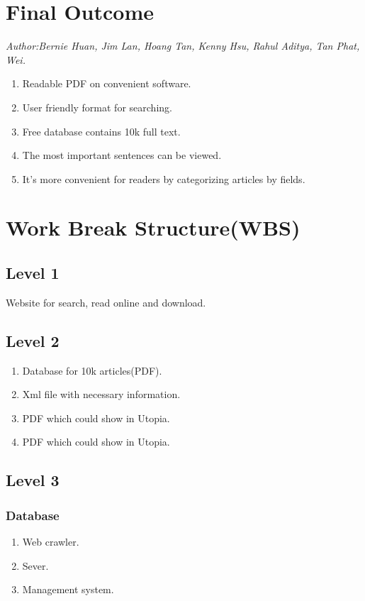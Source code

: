 
\section{Final Outcome}
\textit{\footnotesize Author:Bernie Huan, Jim Lan, Hoang Tan, Kenny Hsu, Rahul Aditya, Tan Phat, Wei.}\\
\begin{enumerate}
	\item Readable PDF on convenient software.
	\item User friendly format for searching.
	\item Free database contains 10k full text.
	\item The most important sentences can be viewed.
	\item It’s more convenient for readers by categorizing articles by fields.
\end{enumerate}
\section{Work Break Structure(WBS)}
\subsection*{Level 1}
Website for search, read online and download.
\subsection*{Level 2}
\begin{enumerate}
	\item Database for 10k articles(PDF).
	\item Xml file with necessary  information.
	\item PDF which could show in Utopia.
	\item PDF which could show in Utopia.
\end{enumerate}	
\subsection*{Level 3}	
\subsubsection*{Database}
\begin{enumerate}
	\item Web crawler.
	\item Sever.
	\item Management system.
\end{enumerate}	
